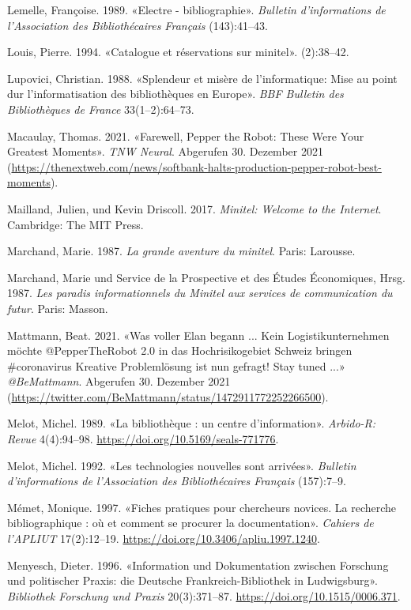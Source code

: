 \documentclass[a4paper,
fontsize=11pt,
oneside,
numbers=noperiodatend,
parskip=half-,
bibliography=totoc,
final
]{scrartcl}
\begin{document}
Lemelle, Françoise. 1989. «Electre - bibliographie». \emph{Bulletin
d'informations de l'Association des Bibliothécaires Français}
(143):41--43.

Louis, Pierre. 1994. «Catalogue et réservations sur minitel».
(2):38--42.

Lupovici, Christian. 1988. «Splendeur et misère de l'informatique: Mise
au point dur l'informa\-tisation des bibliothèques en Europe». \emph{BBF
Bulletin des Bibliothèques de France} 33(1--2):64--73.

Macaulay, Thomas. 2021. «Farewell, Pepper the Robot: These Were Your
Greatest Moments». \emph{TNW \textbar{} Neural}. Abgerufen 30. Dezember
2021
(\url{https://thenextweb.com/news/softbank-halts-production-pepper-robot-best-moments}).

Mailland, Julien, und Kevin Driscoll. 2017. \emph{Minitel: Welcome to
the Internet}. Cambridge: The MIT Press.

Marchand, Marie. 1987. \emph{La grande aventure du minitel}. Paris:
Larousse.

Marchand, Marie und Service de la Prospective et des Études Économiques,
Hrsg. 1987. \emph{Les paradis informationnels du Minitel aux services de
communication du futur}. Paris: Masson.

Mattmann, Beat. 2021. «Was voller Elan begann ... Kein
Logistikunternehmen möchte @PepperTheRobot 2.0 in das Hochrisikogebiet
Schweiz bringen \#coronavirus Kreative Problemlösung ist nun gefragt!
Stay tuned ...» \emph{@BeMattmann}. Abgerufen 30. Dezember 2021
(\url{https://twitter.com/BeMattmann/status/1472911772252266500}).

Melot, Michel. 1989. «La bibliothèque : un centre d'information».
\emph{Arbido-R: Revue}
4(4):94--98. \url{https://doi.org/10.5169/seals-771776}.

Melot, Michel. 1992. «Les technologies nouvelles sont arrivées».
\emph{Bulletin d'informations de l'Asso\-ciation des Bibliothécaires
Français} (157):7--9.

Mémet, Monique. 1997. «Fiches pratiques pour chercheurs novices. La
recherche bibliographique : où et comment se procurer la documentation».
\emph{Cahiers de l'APLIUT} 17(2):12--19.
\url{https://doi.org/10.3406/apliu.1997.1240}.

Menyesch, Dieter. 1996. «Information und Dokumentation zwischen
Forschung und politischer Praxis: die Deutsche Frankreich-Bibliothek in
Ludwigsburg». \emph{Bibliothek Forschung und Praxis} 20(3):371--87.
\url{https://doi.org/10.1515/0006.371}.
\end{document}
